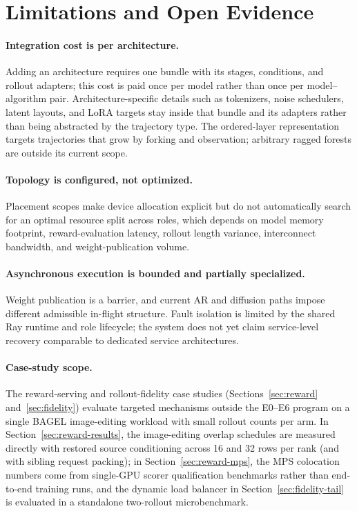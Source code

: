\documentclass[10pt]{article}
\begin{document}
\section{Limitations and Open Evidence}
\label{sec:limitations}

\paragraph{Integration cost is per architecture.}
Adding an architecture requires one bundle with its stages, conditions, and rollout adapters; this cost is paid once per model rather than once per model--algorithm pair.
Architecture-specific details such as tokenizers, noise schedulers, latent layouts, and LoRA targets stay inside that bundle and its adapters rather than being abstracted by the trajectory type.
The ordered-layer representation targets trajectories that grow by forking and observation; arbitrary ragged forests are outside its current scope.

\paragraph{Topology is configured, not optimized.}
Placement scopes make device allocation explicit but do not automatically search for an optimal resource split across roles, which depends on model memory footprint, reward-evaluation latency, rollout length variance, interconnect bandwidth, and weight-publication volume.

\paragraph{Asynchronous execution is bounded and partially specialized.}
Weight publication is a barrier, and current AR and diffusion paths impose different admissible in-flight structure.
Fault isolation is limited by the shared Ray runtime and role lifecycle; the system does not yet claim service-level recovery comparable to dedicated service architectures.

\paragraph{Case-study scope.}
The reward-serving and rollout-fidelity case studies (Sections~\ref{sec:reward} and~\ref{sec:fidelity}) evaluate targeted mechanisms outside the E0--E6 program on a single BAGEL image-editing workload with small rollout counts per arm.
In Section~\ref{sec:reward-results}, the image-editing overlap schedules are measured directly with restored source conditioning across 16 and 32 rows per rank (and with sibling request packing); in Section~\ref{sec:reward-mps}, the MPS colocation numbers come from single-GPU scorer qualification benchmarks rather than end-to-end training runs, and the dynamic load balancer in Section~\ref{sec:fidelity-tail} is evaluated in a standalone two-rollout microbenchmark.
\end{document}
